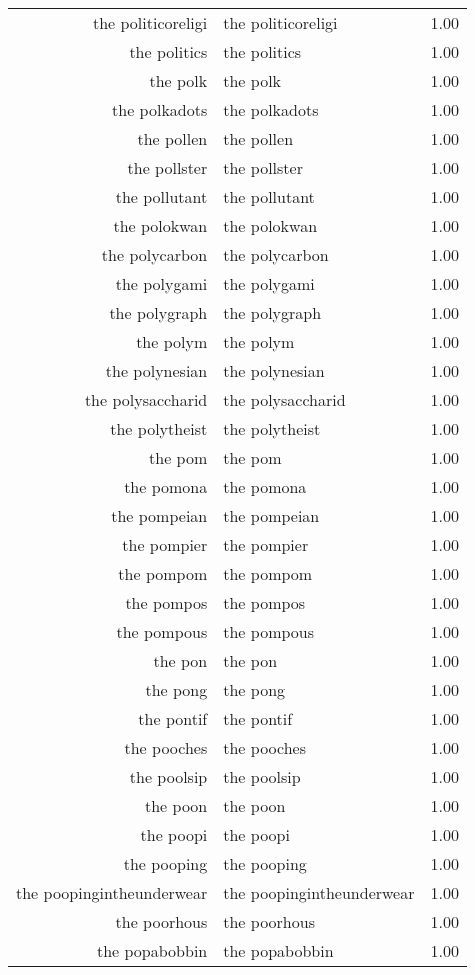 \begin{table}[ht]
\begin{tabular}{rlr}
  the politicoreligi & the politicoreligi & 1.00 \\ 
  the politics & the politics & 1.00 \\ 
  the polk & the polk & 1.00 \\ 
  the polkadots & the polkadots & 1.00 \\ 
  the pollen & the pollen & 1.00 \\ 
  the pollster & the pollster & 1.00 \\ 
  the pollutant & the pollutant & 1.00 \\ 
  the polokwan & the polokwan & 1.00 \\ 
  the polycarbon & the polycarbon & 1.00 \\ 
  the polygami & the polygami & 1.00 \\ 
  the polygraph & the polygraph & 1.00 \\ 
  the polym & the polym & 1.00 \\ 
  the polynesian & the polynesian & 1.00 \\ 
  the polysaccharid & the polysaccharid & 1.00 \\ 
  the polytheist & the polytheist & 1.00 \\ 
  the pom & the pom & 1.00 \\ 
  the pomona & the pomona & 1.00 \\ 
  the pompeian & the pompeian & 1.00 \\ 
  the pompier & the pompier & 1.00 \\ 
  the pompom & the pompom & 1.00 \\ 
  the pompos & the pompos & 1.00 \\ 
  the pompous & the pompous & 1.00 \\ 
  the pon & the pon & 1.00 \\ 
  the pong & the pong & 1.00 \\ 
  the pontif & the pontif & 1.00 \\ 
  the pooches & the pooches & 1.00 \\ 
  the poolsip & the poolsip & 1.00 \\ 
  the poon & the poon & 1.00 \\ 
  the poopi & the poopi & 1.00 \\ 
  the pooping & the pooping & 1.00 \\ 
  the poopingintheunderwear & the poopingintheunderwear & 1.00 \\ 
  the poorhous & the poorhous & 1.00 \\ 
  the popabobbin & the popabobbin & 1.00 \\ 

\end{tabular}
\end{table}

